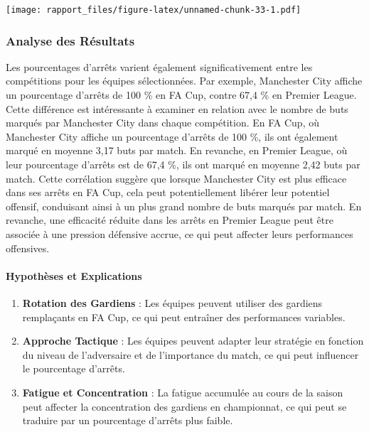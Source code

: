 \documentclass[
]{article}
\providecommand{\tightlist}{%
  \setlength{\itemsep}{0pt}\setlength{\parskip}{0pt}}
\begin{document}
\texttt{[image: rapport\_files/figure-latex/unnamed-chunk-33-1.pdf]}

\subsubsection{Analyse des Résultats}\label{analyse-des-ruxe9sultats-4}

Les pourcentages d'arrêts varient également significativement entre les
compétitions pour les équipes sélectionnées. Par exemple, Manchester
City affiche un pourcentage d'arrêts de 100 \% en FA Cup, contre 67,4 \%
en Premier League. Cette différence est intéressante à examiner en
relation avec le nombre de buts marqués par Manchester City dans chaque
compétition. En FA Cup, où Manchester City affiche un pourcentage
d'arrêts de 100 \%, ils ont également marqué en moyenne 3,17 buts par
match. En revanche, en Premier League, où leur pourcentage d'arrêts est
de 67,4 \%, ils ont marqué en moyenne 2,42 buts par match. Cette
corrélation suggère que lorsque Manchester City est plus efficace dans
ses arrêts en FA Cup, cela peut potentiellement libérer leur potentiel
offensif, conduisant ainsi à un plus grand nombre de buts marqués par
match. En revanche, une efficacité réduite dans les arrêts en Premier
League peut être associée à une pression défensive accrue, ce qui peut
affecter leurs performances offensives.

\paragraph{Hypothèses et
Explications}\label{hypothuxe8ses-et-explications-3}

\begin{enumerate}
\def\labelenumi{\arabic{enumi}.}
\tightlist
\item
  \textbf{Rotation des Gardiens} : Les équipes peuvent utiliser des
  gardiens remplaçants en FA Cup, ce qui peut entraîner des performances
  variables.
\item
  \textbf{Approche Tactique} : Les équipes peuvent adapter leur
  stratégie en fonction du niveau de l'adversaire et de l'importance du
  match, ce qui peut influencer le pourcentage d'arrêts.
\item
  \textbf{Fatigue et Concentration} : La fatigue accumulée au cours de
  la saison peut affecter la concentration des gardiens en championnat,
  ce qui peut se traduire par un pourcentage d'arrêts plus faible.
\end{enumerate}
\end{document}
